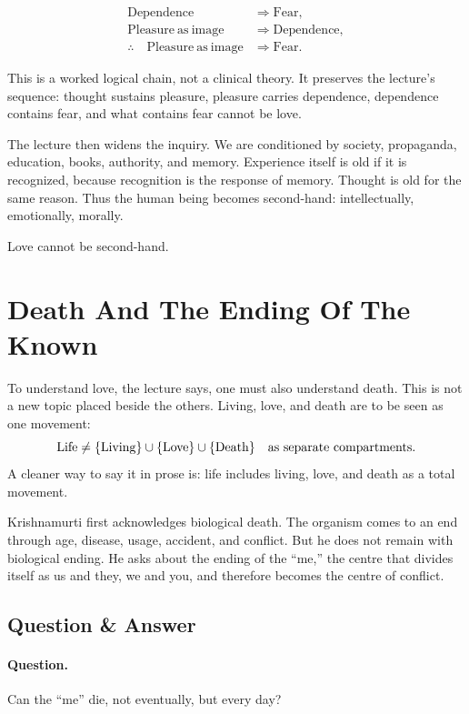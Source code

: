 \begin{align}
\mathrm{Dependence} &\Rightarrow \mathrm{Fear}, \\
\mathrm{Pleasure\ as\ image} &\Rightarrow \mathrm{Dependence}, \\
\therefore\quad \mathrm{Pleasure\ as\ image} &\Rightarrow \mathrm{Fear}.
\end{align}

This is a worked logical chain, not a clinical theory. It preserves the lecture's sequence: thought sustains pleasure, pleasure carries dependence, dependence contains fear, and what contains fear cannot be love.

The lecture then widens the inquiry. We are conditioned by society, propaganda, education, books, authority, and memory. Experience itself is old if it is recognized, because recognition is the response of memory. Thought is old for the same reason. Thus the human being becomes second-hand: intellectually, emotionally, morally.

Love cannot be second-hand.

\section{Death And The Ending Of The Known}

To understand love, the lecture says, one must also understand death. This is not a new topic placed beside the others. Living, love, and death are to be seen as one movement:
\begin{equation}
\mathrm{Life} \neq
\{\mathrm{Living}\}\cup\{\mathrm{Love}\}\cup\{\mathrm{Death}\}
\quad\hbox{as separate compartments.}
\end{equation}
A cleaner way to say it in prose is: life includes living, love, and death as a total movement.

Krishnamurti first acknowledges biological death. The organism comes to an end through age, disease, usage, accident, and conflict. But he does not remain with biological ending. He asks about the ending of the ``me,'' the centre that divides itself as us and they, we and you, and therefore becomes the centre of conflict.

\subsection{Question \& Answer}

\paragraph{Question.}
Can the ``me'' die, not eventually, but every day?

